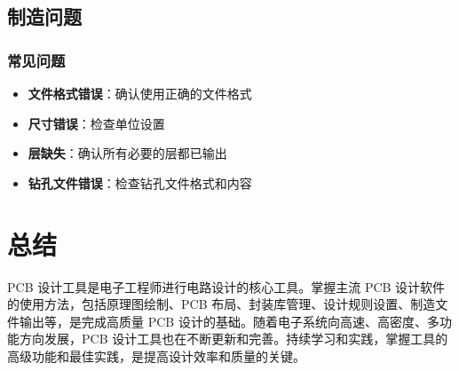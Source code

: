 \subsection{制造问题}

\subsubsection{常见问题}

\begin{itemize}
  \item \textbf{文件格式错误}：确认使用正确的文件格式
  \item \textbf{尺寸错误}：检查单位设置
  \item \textbf{层缺失}：确认所有必要的层都已输出
  \item \textbf{钻孔文件错误}：检查钻孔文件格式和内容
\end{itemize}

\section{总结}

PCB 设计工具是电子工程师进行电路设计的核心工具。掌握主流 PCB 设计软件的使用方法，包括原理图绘制、PCB 布局、封装库管理、设计规则设置、制造文件输出等，是完成高质量 PCB 设计的基础。随着电子系统向高速、高密度、多功能方向发展，PCB 设计工具也在不断更新和完善。持续学习和实践，掌握工具的高级功能和最佳实践，是提高设计效率和质量的关键。
